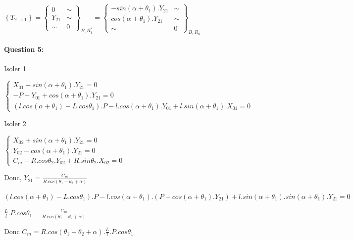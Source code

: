 $\left\{T_{2\rightarrow 1}\right\}=\left\{\begin{array}{cc}
0 & \sim \\
Y_{21} & \sim \\
\sim & 0
\end{array}\right\}_{B,R_1^*}=
\left\{\begin{array}{cc}
-sin(\alpha+\theta_1).Y_{21} & \sim \\
cos(\alpha+\theta_1).Y_{21} & \sim \\
\sim & 0
\end{array}\right\}_{B,R_0}$

\paragraph{Question 5:}

Isoler 1

$\left\{\begin{array}{l}
X_{01}-sin(\alpha+\theta_1).Y_{21}=0 \\
-P+Y_{01}+cos(\alpha+\theta_1).Y_{21}=0 \\
(l.cos(\alpha+\theta_1)-L.cos\theta_1).P-l.cos(\alpha+\theta_1).Y_{01}+l.sin(\alpha+\theta_1).X_{01}=0
\end{array}\right.$

Isoler 2

$\left\{\begin{array}{l}
X_{02}+sin(\alpha+\theta_1).Y_{21}=0 \\
Y_{02}-cos(\alpha+\theta_1).Y_{21}=0 \\
C_m-R.cos\theta_2.Y_{02}+R.sin\theta_2.X_{02}=0
\end{array}\right.$

Donc, $Y_{21}=\frac{C_m}{R.cos(\theta_1-\theta_2+\alpha)}$

$(l.cos(\alpha+\theta_1)-L.cos\theta_1).P-l.cos(\alpha+\theta_1).(P-cos(\alpha+\theta_1).Y_{21})+l.sin(\alpha+\theta_1).sin(\alpha+\theta_1).Y_{21}=0$

$\frac{L}{l}.P.cos\theta_1=\frac{C_m}{R.cos(\theta_1-\theta_2+\alpha)}$

Donc $C_m=R.cos(\theta_1-\theta_2+\alpha).\frac{L}{l}.P.cos\theta_1$



